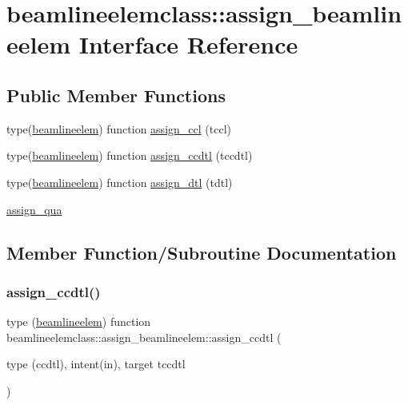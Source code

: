 \hypertarget{interfacebeamlineelemclass_1_1assign__beamlineelem}{}\section{beamlineelemclass\+::assign\+\_\+beamlineelem Interface Reference}
\label{interfacebeamlineelemclass_1_1assign__beamlineelem}
\subsection*{Public Member Functions}
\begin{DoxyCompactItemize}
\item 
type(\mbox{\hyperlink{namespacebeamlineelemclass_structbeamlineelemclass_1_1beamlineelem}{beamlineelem}}) function \mbox{\hyperlink{interfacebeamlineelemclass_1_1assign__beamlineelem_abded7e5ba7aa2a8106dff0c433f70b19}{assign\+\_\+ccl}} (tccl)
\item 
type(\mbox{\hyperlink{namespacebeamlineelemclass_structbeamlineelemclass_1_1beamlineelem}{beamlineelem}}) function \mbox{\hyperlink{interfacebeamlineelemclass_1_1assign__beamlineelem_a93c0ea3813b605659269acd75150fcd4}{assign\+\_\+ccdtl}} (tccdtl)
\item 
type(\mbox{\hyperlink{namespacebeamlineelemclass_structbeamlineelemclass_1_1beamlineelem}{beamlineelem}}) function \mbox{\hyperlink{interfacebeamlineelemclass_1_1assign__beamlineelem_a08ba181a8c8ad88175fa98bcd5a2fcc0}{assign\+\_\+dtl}} (tdtl)
\item 
\mbox{\hyperlink{interfacebeamlineelemclass_1_1assign__beamlineelem_a50bef054e3516531a9f520ff3e820b51}{assign\+\_\+qua}}
\end{DoxyCompactItemize}


\subsection{Member Function/\+Subroutine Documentation}
\mbox{\label{interfacebeamlineelemclass_1_1assign__beamlineelem_a93c0ea3813b605659269acd75150fcd4}} 
\subsubsection{\texorpdfstring{assign\_ccdtl()}{assign\_ccdtl()}}
{\footnotesize\ttfamily type (\mbox{\hyperlink{namespacebeamlineelemclass_structbeamlineelemclass_1_1beamlineelem}{beamlineelem}}) function beamlineelemclass\+::assign\+\_\+beamlineelem\+::assign\+\_\+ccdtl (\begin{DoxyParamCaption}\item[{type (ccdtl), intent(in), target}]{tccdtl }\end{DoxyParamCaption})}

